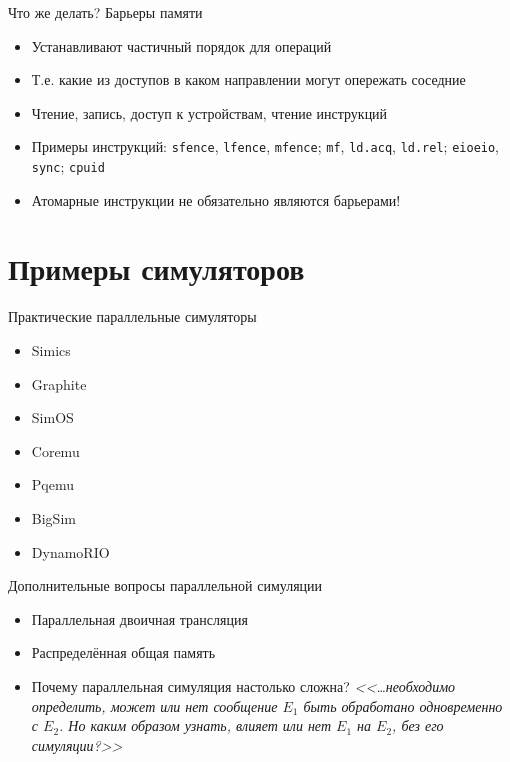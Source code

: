 \documentclass{beamer}
\begin{document}
\begin{frame}{Что же делать? Барьеры памяти}
\begin{itemize}
    \item Устанавливают частичный порядок для операций
    \item Т.е. какие из доступов в каком направлении могут опережать соседние
    \item Чтение, запись, доступ к устройствам, чтение инструкций
    \item Примеры инструкций: \texttt{sfence}, \texttt{lfence}, \texttt{mfence}; \texttt{mf}, \texttt{ld.acq}, \texttt{ld.rel}; \texttt{eioeio}, \texttt{sync}; \texttt{cpuid}
	\item Атомарные инструкции не обязательно являются барьерами!
\end{itemize}
\end{frame}

\section{Примеры симуляторов}

\begin{frame}{Практические параллельные симуляторы}
\begin{itemize}
    \item Simics
    \item Graphite
    \item SimOS
    \item Coremu
    \item Pqemu
    \item BigSim
    \item DynamoRIO
\end{itemize}
\end{frame}

\begin{frame}{Дополнительные вопросы параллельной симуляции}
\begin{itemize}
	\item Параллельная двоичная трансляция
	\item Распределённая общая память \pause
	\item Почему параллельная симуляция настолько сложна? \pause \textit{<<\dots необходимо определить, может или нет сообщение $E_1$ быть обработано одновременно с $E_2$. Но каким образом узнать, влияет или нет $E_1$ на $E_2$, без его симуляции?>>}
\end{itemize}    
\end{frame}
\end{document}
